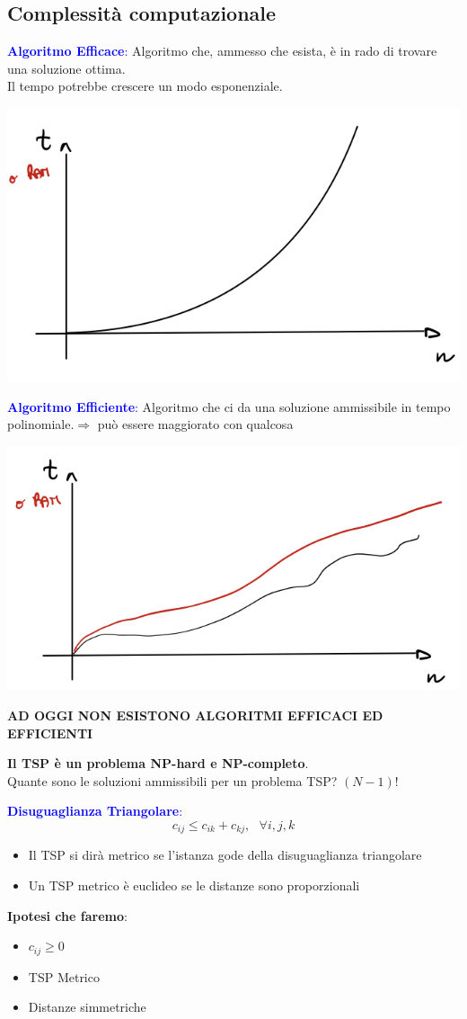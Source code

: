 \documentclass[12pt,a4paper]{article}
\begin{document}
\subsection{Complessità computazionale}
\textcolor{blue}{\textbf{Algoritmo Efficace}:} Algoritmo che, ammesso che esista, è in rado di trovare una soluzione ottima.\\
Il tempo potrebbe crescere un modo esponenziale.
\begin{center}
\includegraphics[width=0.3\columnwidth]{img/alg_efficace.jpg}
\end{center}
\textcolor{blue}{\textbf{Algoritmo Efficiente}:} Algoritmo che ci da una soluzione ammissibile in tempo polinomiale.$\Rightarrow$ può essere maggiorato con qualcosa\\
\begin{center}
\includegraphics[width=0.3\columnwidth]{img/alg_efficiente.jpg}
\end{center}
\begin{center}
\textbf{AD OGGI NON ESISTONO ALGORITMI EFFICACI ED EFFICIENTI}
\end{center}

\Sep \noindent
\textbf{Il TSP è un problema NP-hard e NP-completo}.\\
Quante sono le soluzioni ammissibili per un problema TSP? $(N-1)!$

\Sep \noindent
\textcolor{blue}{\textbf{Disuguaglianza Triangolare}:} $$c_{ij} \leq c_{ik}+c_{kj}, \ \ \ \forall i,j,k $$
\begin{itemize}
\item Il TSP si dirà metrico se l'istanza gode della disuguaglianza triangolare
\item Un TSP metrico è euclideo se le distanze sono proporzionali
\end{itemize}
\textbf{Ipotesi che faremo}: \begin{itemize}
\item $c_{ij} \geq 0$
\item TSP Metrico
\item Distanze simmetriche
\end{itemize}
\end{document}
